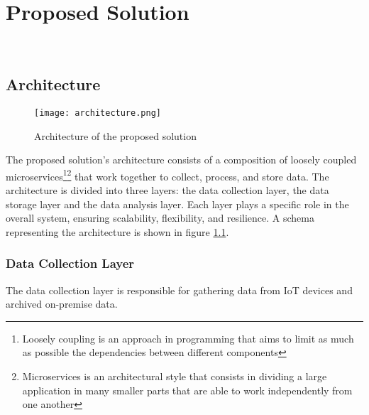 \chapter{Proposed Solution}
\label{cap:method}

\\


\section{Architecture}
\label{sec:architecture}
\begin{figure}[htbp]
    \centering
    \texttt{[image: architecture.png]}
    \caption{Architecture of the proposed solution}
    \label{fig:architecture}
\end{figure}
The proposed solution's architecture consists of a composition of loosely coupled microservices\footnote{Loosely coupling is an approach in programming that aims to limit as much as possible the dependencies between different components}\footnote{Microservices is an architectural style that consists in dividing a large application in many smaller parts that are able to work independently from one another} that work together to collect, process, and store data. The architecture is divided into three layers: the data collection layer, the data storage layer and the data analysis layer. Each layer plays a specific role in the overall system, ensuring scalability, flexibility, and resilience. A schema representing the architecture is shown in figure \ref{fig:architecture}.

\subsection{Data Collection Layer}

The data collection layer is responsible for gathering data from IoT devices and archived on-premise data. 

